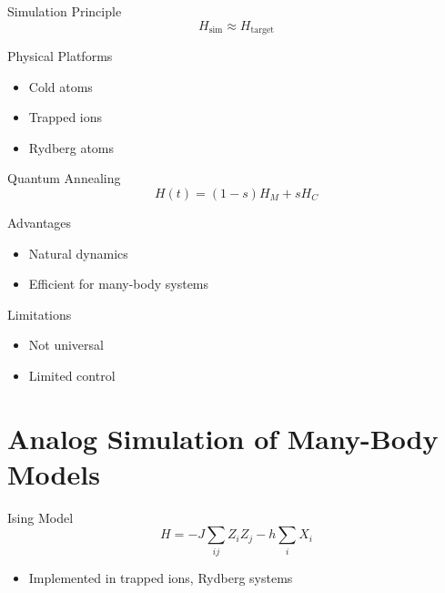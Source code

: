 \documentclass{beamer}
\begin{document}

\begin{frame}{Simulation Principle}
\[
H_{\text{sim}} \approx H_{\text{target}}
\]
\end{frame}


\begin{frame}{Physical Platforms}
\begin{itemize}
\item Cold atoms
\item Trapped ions
\item Rydberg atoms
\end{itemize}
\end{frame}


\begin{frame}{Quantum Annealing}
\[
H(t) = (1-s)H_M + sH_C
\]
\end{frame}


\begin{frame}{Advantages}
\begin{itemize}
\item Natural dynamics
\item Efficient for many-body systems
\end{itemize}
\end{frame}


\begin{frame}{Limitations}
\begin{itemize}
\item Not universal
\item Limited control
\end{itemize}
\end{frame}

\section{Analog Simulation of Many-Body Models}

\begin{frame}{Ising Model}
\[
H = -J \sum_{ij} Z_i Z_j - h \sum_i X_i
\]
\begin{itemize}
\item Implemented in trapped ions, Rydberg systems
\end{itemize}
\end{frame}
\end{document}
